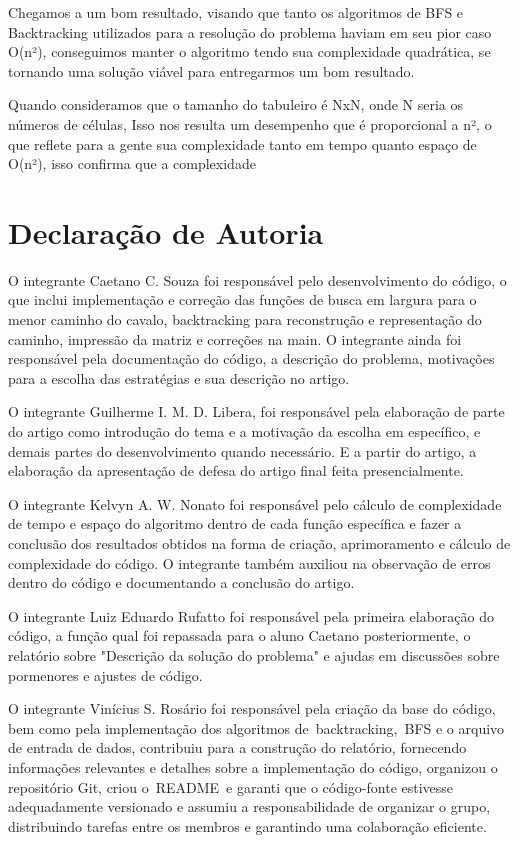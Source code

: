 \documentclass[relatorio]{IEEEtran}
\begin{document}
Chegamos a um bom resultado, visando que tanto os algoritmos de BFS e Backtracking utilizados para a resolução do problema haviam em seu pior caso O(n²), conseguimos manter o algoritmo tendo sua complexidade quadrática, se tornando uma solução viável para entregarmos um bom resultado.

Quando consideramos que o tamanho do tabuleiro é NxN, onde N seria os números de células, Isso nos resulta um desempenho que é proporcional a n², o que reflete para a gente sua complexidade tanto em tempo quanto espaço de O(n²), isso confirma que a complexidade 

\section{Declaração de Autoria}
O integrante Caetano C. Souza foi responsável pelo desenvolvimento do código, o que inclui implementação e correção das funções de busca em largura para o menor caminho do cavalo, backtracking para reconstrução e representação do caminho, impressão da matriz e correções na main. O integrante ainda foi responsável pela documentação do código, a descrição do problema, motivações para a escolha das estratégias e sua descrição no artigo. 

O integrante Guilherme I. M. D. Libera, foi responsável pela elaboração de parte do artigo como introdução do tema e a motivação da escolha em específico, e demais partes do desenvolvimento quando necessário. E a partir do artigo, a elaboração da apresentação de defesa do artigo final feita presencialmente.

O integrante Kelvyn A. W. Nonato foi responsável pelo cálculo de complexidade de tempo e espaço do algoritmo dentro de cada função específica e fazer a conclusão dos resultados obtidos na forma de criação, aprimoramento e cálculo de complexidade do código. O integrante também auxiliou na observação de erros dentro do código e documentando a conclusão do artigo.

O integrante Luiz Eduardo Rufatto foi responsável pela primeira elaboração do código, a função qual foi repassada para o aluno Caetano posteriormente, o relatório sobre "Descrição da solução do problema" e ajudas em discussões sobre pormenores e ajustes de código.

O integrante Vinícius S. Rosário foi responsável pela criação da base do código, bem como pela implementação dos algoritmos de backtracking, BFS e o arquivo de entrada de dados, contribuiu para a construção do relatório, fornecendo informações relevantes e detalhes sobre a implementação do código, organizou o repositório Git, criou o README e garanti que o código-fonte estivesse adequadamente versionado e assumiu a responsabilidade de organizar o grupo, distribuindo tarefas entre os membros e garantindo uma colaboração eficiente.
\end{document}
